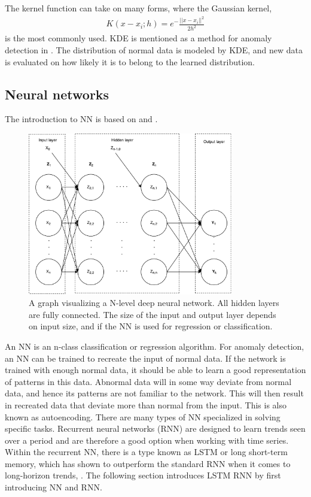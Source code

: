         The kernel function can take on many forms, where the Gaussian kernel,
        \begin{align}
            K(x-x_i;h) = e^-\frac{||x-x_i||^2}{2h^2}
        \end{align}
        is the most commonly used. KDE is mentioned as a method for anomaly detection in \cite{Pimentel2014}. The distribution of normal data is modeled by KDE, and new data is evaluated on how likely it is to belong to the learned distribution.
        

    \subsection{Neural networks}
        The introduction to NN is based on \cite{Aasnes2017} and \cite{Hastie}. 
        \begin{figure}[h]
            \centering
            \includegraphics[width=0.8\textwidth]{report/figures/techniques/neural_network.pdf}
            \caption{A graph visualizing a N-level deep neural network. All hidden layers are fully connected. The size of the input and output layer depends on input size, and if the NN is used for regression or classification.}
            \label{fig:nn_fullnetwork}
        \end{figure}
        
        An NN is an n-class classification or regression algorithm. For anomaly detection, an NN can be trained to recreate the input of normal data. If the network is trained with enough normal data, it should be able to learn a good representation of patterns in this data. Abnormal data will in some way deviate from normal data, and hence its patterns are not familiar to the network. This will then result in recreated data that deviate more than normal from the input. This is also known as autoencoding. There are many types of NN specialized in solving specific tasks. Recurrent neural networks (RNN) are designed to learn trends seen over a period and are therefore a good option when working with time series. Within the recurrent NN, there is a type known as LSTM or long short-term memory, which has shown to outperform the standard RNN when it comes to long-horizon trends, \cite{Courville2016}. The following section introduces LSTM RNN by first introducing NN and RNN.  
        
